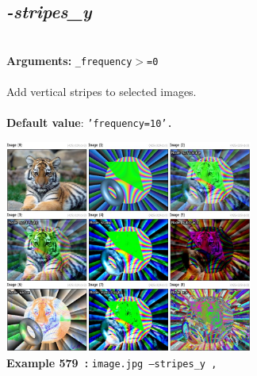 \documentclass[a4paper,11pt,twoside]{book}
\begin{document}
\subsection{\emph{-stripes\_y} }\vspace*{-0.5em}
~\\\textbf{Arguments: } 
{\small \texttt{\_frequency$>$=0}}\\~\\
Add vertical stripes to selected images.
~\\~\\\textbf{Default value}: {\small \texttt{'frequency=10'.}}
\begin{center}\includegraphics[keepaspectratio=true,height=7cm,width=\textwidth]{img/gmic_def579.jpg}\\
{\footnotesize \textbf{Example 579~:} \texttt{image.jpg --stripes\_y ,}}
\end{center}
\end{document}
